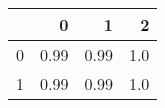 \begin{tabular}{lrrr}
\toprule
{} &     0 &     1 &    2 \\
\midrule
0 &  0.99 &  0.99 &  1.0 \\
1 &  0.99 &  0.99 &  1.0 \\
\bottomrule
\end{tabular}
